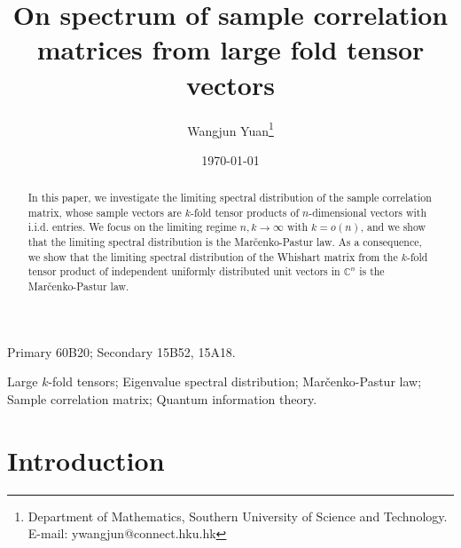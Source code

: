 \documentclass[12pt]{article}
\numberwithin{equation}{section} \theoremstyle{plain}
\begin{document}
\title{On spectrum of sample correlation matrices from large fold tensor vectors}

\date{\today}
\author{Wangjun Yuan\thanks{Department of Mathematics, Southern University of Science and Technology. E-mail: ywangjun@connect.hku.hk}}
\maketitle

\begin{abstract}
In this paper, we investigate the limiting spectral distribution of the sample correlation matrix, whose sample vectors are $k$-fold tensor products of $n$-dimensional vectors with i.i.d. entries. We focus on the limiting regime $n,k \to \infty$ with $k = o(n)$, and we show that the limiting spectral distribution is the Mar\v{c}enko-Pastur law.
As a consequence, we show that the limiting spectral distribution of the Whishart matrix from the $k$-fold tensor product of independent uniformly distributed unit vectors in $\mathbb C^n$ is the Mar\v{c}enko-Pastur law.
\end{abstract}

 Primary 60B20; Secondary 15B52, 15A18.

\medskip 

 Large $k$-fold tensors; Eigenvalue spectral distribution; Mar\v{c}enko-Pastur law; Sample correlation matrix; Quantum information theory. 
 
%
\section{Introduction}
\label{sec:intro}
\end{document}
